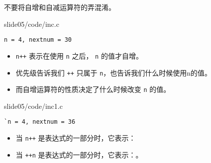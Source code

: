 \begin{frame}[fragile]
不要将自增和自减运算符的弄混淆。
\end{frame}

\begin{frame}[fragile]
  
  {slide05/code/inc.c}  \pause 

\begin{lstlisting}[backgroundcolor=\color{red!10}]
n = 4, nextnum = 30
\end{lstlisting}
\end{frame}

\begin{frame}[fragile]
\begin{itemize}
\item \lstinline|n++| 表示在使用 \lstinline|n| 之后， \lstinline|n| 的值才自增。\\[0.1in]
\item 优先级告诉我们 \lstinline|++| 只属于 \lstinline|n|，也告诉我们什么时候使用n的值。\\[0.1in]
\item 而自增运算符的性质决定了什么时候改变 \lstinline|n| 的值。
\end{itemize}
\end{frame}

\begin{frame}[fragile]
  
  {slide05/code/inc1.c}\pause 

\begin{lstlisting}[backgroundcolor=\color{red!10}]
`n = 4, nextnum = 36
\end{lstlisting}
\end{frame}

\begin{frame}[fragile]
\begin{itemize}
\item  当 \lstinline|n++| 是表达式的一部分时，它表示：\\[0.1in]
\item 当 \lstinline|++n| 是表达式的一部分时，它表示：。
\end{itemize}
\end{frame}

